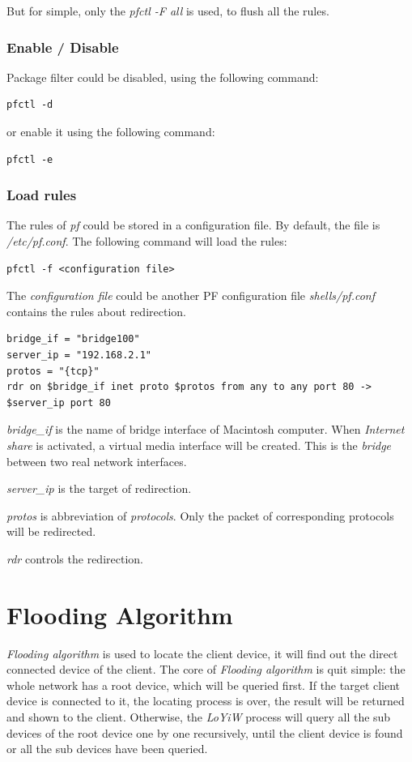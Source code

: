 But for simple, only the \textit{pfctl -F all} is used, to flush all the rules.

\subsubsection{Enable / Disable}
Package filter could be disabled, using the following command:

\begin{lstlisting}
pfctl -d
\end{lstlisting}

or enable it using the following command:
\begin{lstlisting}
pfctl -e
\end{lstlisting}

\subsubsection{Load rules}

The rules of \textit{pf} could be stored in a configuration file. By default, the file is \textit{/etc/pf.conf}. The following command will load the rules:

\begin{lstlisting}
pfctl -f <configuration file>
\end{lstlisting}

The \textit{configuration file} could be another PF configuration file \textit{shells/pf.conf} contains the rules about redirection. 

\begin{lstlisting}[caption={Sample of pf.conf}]
bridge_if = "bridge100"
server_ip = "192.168.2.1"
protos = "{tcp}"
rdr on $bridge_if inet proto $protos from any to any port 80 -> $server_ip port 80
\end{lstlisting}

\textit{bridge\_if} is the name of bridge interface of Macintosh computer. When \textit{Internet share} is activated, a virtual media interface will be created. This is the \textit{bridge} between two real network interfaces.

\textit{server\_ip} is the target of redirection.

\textit{protos} is abbreviation of \textit{protocols}. Only the packet of corresponding protocols will be redirected.

\textit{rdr} controls the redirection.

\section{Flooding Algorithm}

\textit{Flooding algorithm} is used to locate the client device, it will find out the direct connected device of the client. The core of \textit{Flooding algorithm} is quit simple: the whole network has a root device, which will be queried first. If the target client device is connected to it, the locating process is over, the result will be returned and shown to the client. Otherwise, the \textit{LoYiW} process will query all the sub devices of the root device one by one recursively, until the client device is found or all the sub devices have been queried.